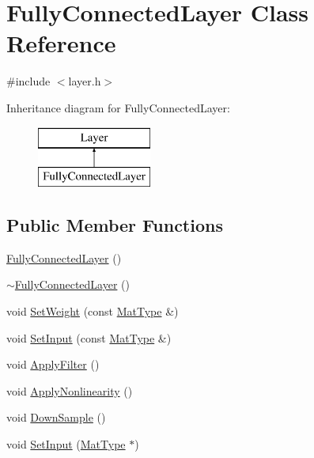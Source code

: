 \hypertarget{class_fully_connected_layer}{\section{Fully\+Connected\+Layer Class Reference}
\label{class_fully_connected_layer}
}


{\ttfamily \#include $<$layer.\+h$>$}

Inheritance diagram for Fully\+Connected\+Layer\+:\begin{figure}[H]
\begin{center}
\leavevmode
\includegraphics[height=2.000000cm]{class_fully_connected_layer}
\end{center}
\end{figure}
\subsection*{Public Member Functions}
\begin{DoxyCompactItemize}
\item 
\hyperlink{class_fully_connected_layer_a399b0549166854ec171cabea3874c4af}{Fully\+Connected\+Layer} ()
\item 
\hyperlink{class_fully_connected_layer_a60bfc88cd585a78f5a3757b044cfecf7}{$\sim$\+Fully\+Connected\+Layer} ()
\item 
void \hyperlink{class_fully_connected_layer_a13326e661fb3459d05653972d8ed0e5c}{Set\+Weight} (const \hyperlink{utils_8h_a87f2f26b431d56aa72b3d4d6cd5c6f62}{Mat\+Type} \&)
\item 
void \hyperlink{class_fully_connected_layer_ac96e17c6a1ac93a36d2228e300ac6103}{Set\+Input} (const \hyperlink{utils_8h_a87f2f26b431d56aa72b3d4d6cd5c6f62}{Mat\+Type} \&)
\item 
void \hyperlink{class_fully_connected_layer_a71b13c03aed1aa3b97920279e3534f7b}{Apply\+Filter} ()
\item 
void \hyperlink{class_fully_connected_layer_aeaa164864cf41ae5fe116cf8533a1817}{Apply\+Nonlinearity} ()
\item 
void \hyperlink{class_fully_connected_layer_ae769cfe87e16198f8b0959f87bfb3100}{Down\+Sample} ()
\item 
void \hyperlink{class_fully_connected_layer_abc76d6caa38d466a2b58d824e50a9eb2}{Set\+Input} (\hyperlink{utils_8h_a87f2f26b431d56aa72b3d4d6cd5c6f62}{Mat\+Type} $\ast$)
\end{DoxyCompactItemize}
